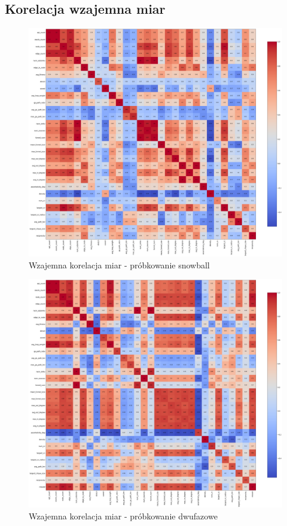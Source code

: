 \subsection{Korelacja wzajemna miar}

\begin{figure}[h!]
    \centering
    \includegraphics[width=\textwidth]{chapters/experiments/img/snowball_corr.png}
    \caption{Wzajemna korelacja miar - próbkowanie snowball}
    \label{fig:corr_snowball}
\end{figure}

\begin{figure}[h!]
    \centering
    \includegraphics[width=\textwidth]{chapters/experiments/img/twophase_corr.png}
    \caption{Wzajemna korelacja miar - próbkowanie dwufazowe}
    \label{fig:corr_twophase}
\end{figure}
